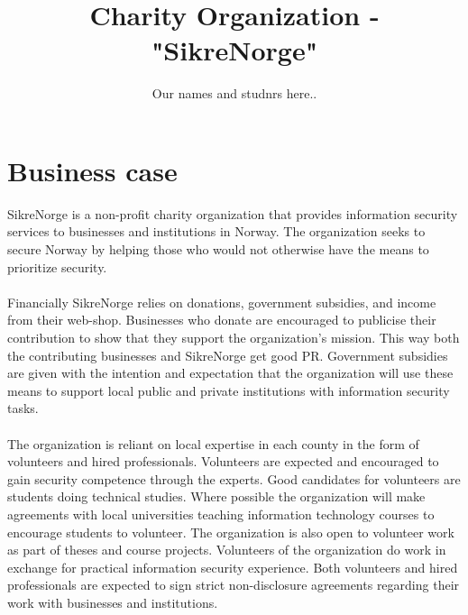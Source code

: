 

\title{Charity Organization - "SikreNorge"}
\author{Our names and studnrs here..}



\maketitle


\thispagestyle{empty}

\clearpage
{}
\setcounter{page}{1}
\tableofcontents

\clearpage
{}


\section{Business case}

SikreNorge is a non-profit charity organization that provides information security services to businesses and institutions in Norway. The organization seeks to secure Norway by helping those who would not otherwise have the means to prioritize security.
\\
\\
Financially SikreNorge relies on donations, government subsidies, and income from their web-shop. Businesses who donate are encouraged to publicise their contribution to show that they support the organization's mission. This way both the contributing businesses and SikreNorge get good PR. Government subsidies are given with the intention and expectation that the organization will use these means to support local public and private institutions with information security tasks.
\\
\\
The organization is reliant on local expertise in each county in the form of volunteers and hired professionals. Volunteers are expected and encouraged to gain security competence through the experts. Good candidates for volunteers are students doing technical studies. Where possible the organization will make agreements with local universities teaching information technology courses to encourage students to volunteer. The organization is also open to volunteer work as part of theses and course projects. Volunteers of the organization do work in exchange for practical information security experience. Both volunteers and hired professionals are expected to sign strict non-disclosure agreements regarding their work with businesses and institutions.

